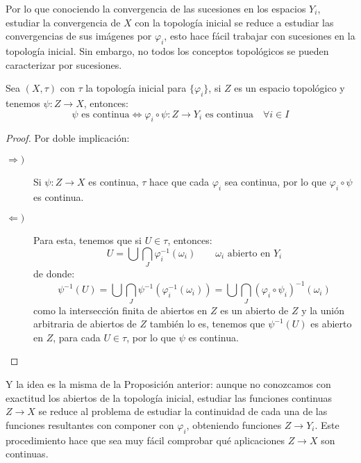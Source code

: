 \noindent
Por lo que conociendo la convergencia de las sucesiones en los espacios $Y_i$, estudiar la convergencia de $X$ con la topología inicial se reduce a estudiar las convergencias de sus imágenes por $\varphi_i$, esto hace fácil trabajar con sucesiones en la topología inicial. Sin embargo, no todos los conceptos topológicos se pueden caracterizar por sucesiones.

\begin{prop}
    Sea $(X,\tau)$ con $\tau$ la topología inicial para $\{\varphi_i\}$, si $Z$ es un espacio topológico y tenemos $\psi:Z\to X$, entonces:
    \begin{equation*}
        \psi \text{\ es continua} \Longleftrightarrow \varphi_i\circ \psi:Z\to Y_i \text{\ es continua}\quad \forall i \in I
    \end{equation*}
    \begin{proof}
        Por doble implicación:
        \begin{description}
            \item [$\Longrightarrow )$] Si $\psi:Z\to X$ es continua, $\tau$ hace que cada $\varphi_i$ sea continua, por lo que $\varphi_i\circ\psi$ es continua.
            \item [$\Longleftarrow )$] Para esta, tenemos que si $U\in \tau$, entonces:
                \begin{equation*}
                    U = \bigcup \bigcap_{J} \varphi_i^{-1}(\omega_i) \qquad \omega_i \text{\ abierto en\ } Y_i
                \end{equation*}
                de donde:
                \begin{equation*}
                    \psi^{-1}(U) = \bigcup\bigcap_{J}\psi^{-1}(\varphi^{-1}_i(\omega_i)) = \bigcup\bigcap_J {(\varphi_i \circ \psi_i)}^{-1}(\omega_i)
                \end{equation*}
                como la intersección finita de abiertos en $Z$ es un abierto de $Z$ y la unión arbitraria de abiertos de $Z$ también lo es, tenemos que $\psi^{-1}(U)$ es abierto en $Z$, para cada $U\in \tau$, por lo que $\psi$ es continua.
        \end{description}
    \end{proof}
\end{prop}

\noindent
Y la idea es la misma de la Proposición anterior: aunque no conozcamos con exactitud los abiertos de la topología inicial, estudiar las funciones continuas $Z\to X$ se reduce al problema de estudiar la continuidad de cada una de las funciones resultantes con componer con $\varphi_i$, obteniendo funciones $Z\to Y_i$. Este procedimiento hace que sea muy fácil comprobar qué aplicaciones $Z\to X$ son continuas.

